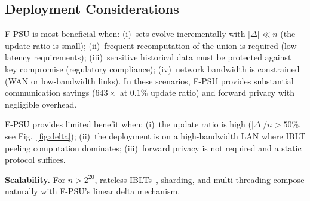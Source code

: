 \documentclass[letterpaper,twocolumn,10pt]{article}
\theoremstyle{definition}
\begin{document}
\subsection{Deployment Considerations}
\label{sec:deployment}

F-PSU is most beneficial when: (i)~sets evolve incrementally with
$|\Delta| \ll n$ (the update ratio is small); (ii)~frequent
recomputation of the union is required (low-latency requirements);
(iii)~sensitive historical data must be protected against key compromise
(regulatory compliance); (iv)~network bandwidth is constrained (WAN or
low-bandwidth links). In these scenarios, F-PSU provides substantial
communication savings ($643\times$ at $0.1\%$ update ratio) and forward
privacy with negligible overhead.

F-PSU provides limited benefit when: (i)~the update ratio is high
($|\Delta|/n > 50\%$, see Fig.~\ref{fig:delta}); (ii)~the
deployment is on a high-bandwidth LAN where IBLT peeling computation
dominates; (iii)~forward privacy is not required and a static protocol
suffices.

\smallskip\noindent\textbf{Scalability.}
For $n > 2^{20}$, rateless IBLTs~\cite{YGA24}, sharding, and
multi-threading compose naturally with F-PSU's linear delta mechanism.
\end{document}
